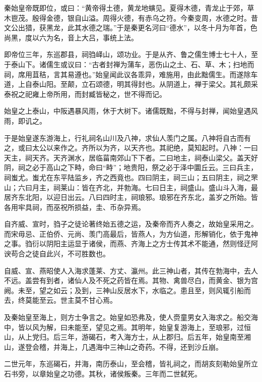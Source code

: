 \documentclass[12pt,UTF8]{ctexbook}
\begin{document}
秦始皇帝既即位，或曰：“黄帝得土德，黄龙地螾见。夏得木德，青龙止于郊，草木鬯茂。殷得金德，银自山溢。周得火德，有赤乌之符。今秦变周，水德之时。昔文公出猎，获黑龙，此其水德之瑞。”于是秦更名河曰“德水”，以冬十月为年首，色尚黑，度以六为名，音上大吕，事统上法。



即帝位三年，东巡郡县，祠驺峄山，颂功业。于是从齐、鲁之儒生博士七十人，至于泰山下。诸儒生或议曰：“古者封禅为蒲车，恶伤山之土、石、草、木；扫地而祠，席用苴秸，言其易遵也。”始皇闻此议各乖异，难施用，由此黜儒生。而遂除车道，上自泰山阳。至颠，立石颂德，明其得封也。从阴道上，禅于梁父。其礼颇采泰祝之祀雍上帝所用，而封臧皆秘之，世不得而记。



始皇之上泰山，中阪遇暴风雨，休于大树下。诸儒既黜，不得与封禅，闻始皇遇风雨，即讥之。



于是始皇遂东游海上，行礼祠名山川及八神，求仙人羡门之属。八神将自古而有之，或曰太公以来作之。齐所以为齐，以天齐也。其祀绝，莫知起时。八神：一曰天主，祠天齐。天齐渊水，居临菑南郊山下下者。二曰地主，祠泰山梁父。盖天好阴，祠之必于高山之下畤，命曰“畤”；地贵阳，祭之必于泽中圜丘云。三曰兵主，祠蚩尤。蚩尤在东平陆监乡，齐之西竟也。四曰阴主，祠三山；五曰阴主，祠之罘山；六曰月主，祠莱山：皆在齐北，并勃海。七曰日主，祠盛山。盛山斗入海，最居齐东北阳，以迎日出云。八曰四时主，祠琅邪。琅邪在齐东北，盖岁之所始。皆各用牢具祠，而巫祝所损益，圭、币杂异焉。



自齐威、宣时，驺子之徒论著终始五德之运，及秦帝而齐人奏之，故始皇采用之。而宋毋忌、正伯侨、元尚、羡门高最后，皆燕人，为方仙道，形解销化，依于鬼神之事。驺衍以阴阳主运显于诸侯，而燕、齐海上之方士传其术不能通，然则怪迂阿谀苟合之徒自此兴，不可胜数也。



自威、宣、燕昭使人入海求蓬莱、方丈、瀛州。此三神山者，其传在勃海中，去人不远。盖尝有到者，诸仙人及不死之药皆在焉。其物、禽兽尽白，而黄金、银为宫阙。未至，望之如云；及到，三神山反居水下，水临之。患且至，则风辄引船而去，终莫能至云。世主莫不甘心焉。



及秦始皇至海上，则方士争言之。始皇如恐弗及，使人赍童男女入海求之。船交海中，皆以风为解，曰未能至，望见之焉。其明年，始皇复游海上，至琅邪，过恒山，从上党归。后三年，游碣石，考入海方士，从上郡归。后五年，始皇南至湘山，遂登会稽，并海上，几遇海中三神山之奇药。不得，还到沙丘崩。



二世元年，东巡碣石，并海，南历泰山，至会稽，皆礼祠之，而胡亥刻勒始皇所立石书旁，以章始皇之功德。其秋，诸侯叛秦。三年而二世弑死。
\end{document}

